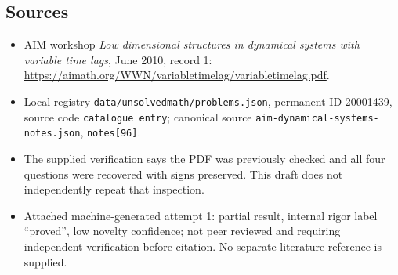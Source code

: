 \documentclass[11pt]{article}
\begin{document}
\subsection{Sources}
\begin{itemize}
\item AIM workshop \emph{Low dimensional structures in dynamical systems with variable time lags}, June 2010, record 1: \url{https://aimath.org/WWN/variabletimelag/variabletimelag.pdf}.
\item Local registry \texttt{data/unsolvedmath/problems.json}, permanent ID 20001439, source code \texttt{catalogue entry}; canonical source \texttt{aim-dynamical-systems-notes.json}, \texttt{notes[96]}.
\item The supplied verification says the PDF was previously checked and all four questions were recovered with signs preserved. This draft does not independently repeat that inspection.
\item Attached machine-generated attempt 1: partial result, internal rigor label ``proved'', low novelty confidence; not peer reviewed and requiring independent verification before citation. No separate literature reference is supplied.
\end{itemize}
\end{document}
